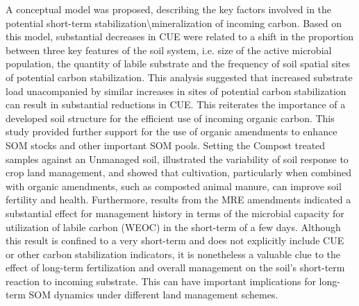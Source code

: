 	A conceptual model was proposed, describing the key factors involved in the potential short-term stabilization\textbackslash mineralization of incoming carbon. Based on this model, substantial decreases in CUE were related to a shift in the proportion between three key features of the soil system, i.e. size of the active microbial population, the quantity of labile substrate and the frequency of soil spatial sites of potential carbon stabilization. This analysis suggested that increased substrate load unacompanied by similar increases in sites of potential carbon stabilization can result in substantial reductions in CUE. This reiterates the importance of a developed soil structure for the efficient use of incoming organic carbon. This study provided further support for the use of organic amendments to enhance SOM stocks and other important SOM pools. Setting the Compost treated samples against an Unmanaged soil, illustrated the variability of soil response to crop land management, and showed that cultivation, particularly when combined with organic amendments, such as composted animal manure, can improve soil fertility and health. Furthermore, results from the MRE amendments indicated a substantial effect for management history in terms of the microbial capacity for utilization of labile carbon (WEOC) in the short-term of a few days. Although this result is confined to a very short-term and does not explicitly include CUE or other carbon stabilization indicators, it is nonetheless a valuable clue to the effect of long-term fertilization and overall management on the soil's short-term reaction to incoming substrate. This can have important implications for long-term SOM dynamics under different land management schemes.  
	         
	
	
     